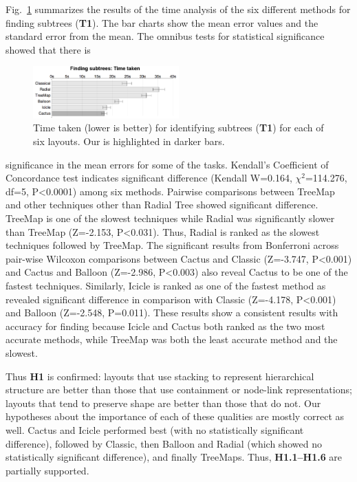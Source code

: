\documentclass[a4paper]{llncs}
\begin{document}
Fig.~\ref{fig:T1-time} summarizes
the results of the time analysis of the six different methods for finding subtrees (\textbf{T1}). The bar charts show the mean error values and the standard error from the mean. The omnibus tests for statistical significance showed that there is
\begin{figure}
 \centering
 \includegraphics[width=0.5\textwidth]{figures2/T1-time.png}
 \caption{\label{fig:T1-time} Time taken (lower is better) for identifying subtrees (\textbf{T1}) for each of six layouts. Our \theName{} is highlighted in darker bars.}
\end{figure}
significance in the mean errors for some of the tasks. Kendall's Coefficient of Concordance test indicates significant difference (Kendall W=0.164, $\chi^2$=114.276, df=5, P\textless0.0001) among six methods. Pairwise comparisons between TreeMap and other techniques other than Radial Tree showed significant difference. TreeMap is one of the slowest techniques while Radial was significantly slower than TreeMap (Z=\mbox{-2.153}, P\textless0.031). Thus, Radial is ranked as the slowest techniques followed by TreeMap. The significant results from Bonferroni across pair-wise Wilcoxon comparisons between Cactus and Classic (Z={-3.747}, P\textless0.001) and Cactus and Balloon (Z=-2.986, P\textless0.003) also reveal Cactus to be one of the fastest techniques. Similarly, Icicle is ranked as one of the fastest method as revealed significant difference in comparison with Classic (Z=-4.178, P\textless0.001) and Balloon (Z=-2.548, P=0.011). These results show a consistent results with accuracy for finding because Icicle and Cactus both ranked as the two most accurate methods, while TreeMap was both the least accurate method and the slowest.



Thus \textbf{H1} is confirmed: layouts that use stacking to represent hierarchical structure are better than those that use containment or node-link representations; layouts that tend to preserve shape are better than those that do not. Our hypotheses about the importance of each of these qualities are mostly correct as well. Cactus and Icicle performed best (with no statistically significant difference), followed by Classic, then Balloon and Radial (which showed no statistically significant difference), and finally TreeMaps. Thus, \textbf{H1.1--H1.6} are partially supported. 
\end{document}
